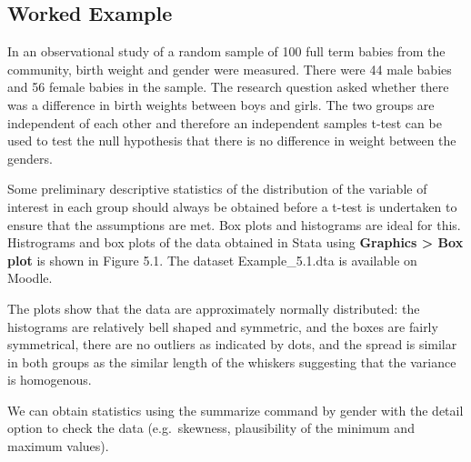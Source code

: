 \documentclass[
]{memoir}
\begin{document}
\hypertarget{worked-example}{%
\subsection{Worked Example}\label{worked-example}}

In an observational study of a random sample of 100 full term babies from the community, birth weight and gender were measured. There were 44 male babies and 56 female babies in the sample. The research question asked whether there was a difference in birth weights between boys and girls. The two groups are independent of each other and therefore an independent samples t-test can be used to test the null hypothesis that there is no difference in weight between the genders.

Some preliminary descriptive statistics of the distribution of the variable of interest in each group should always be obtained before a t-test is undertaken to ensure that the assumptions are met. Box plots and histograms are ideal for this. Histrograms and box plots of the data obtained in Stata using \textbf{Graphics \textgreater{} Box plot} is shown in Figure 5.1. The dataset Example\_5.1.dta is available on Moodle.

The plots show that the data are approximately normally distributed: the histograms are relatively bell shaped and symmetric, and the boxes are fairly symmetrical, there are no outliers as indicated by dots, and the spread is similar in both groups as the similar length of the whiskers suggesting that the variance is homogenous.

We can obtain statistics using the summarize command by gender with the detail option to check the data (e.g.~skewness, plausibility of the minimum and maximum values).
\end{document}
